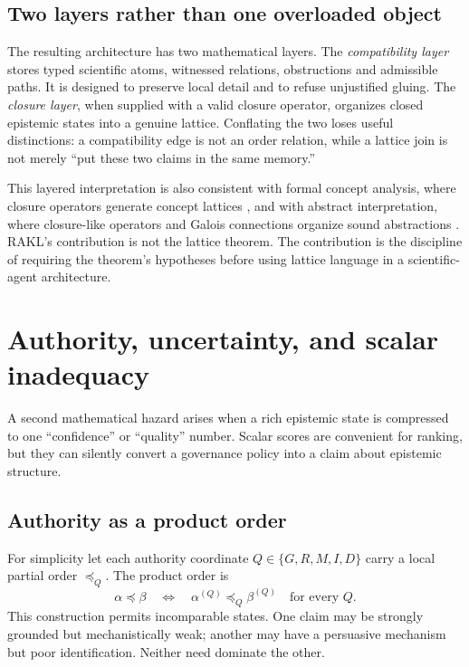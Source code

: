 \documentclass[11pt]{article}
\begin{document}
\subsection{Two layers rather than one overloaded object}

The resulting architecture has two mathematical layers. The \emph{compatibility layer} stores typed scientific atoms, witnessed relations, obstructions and admissible paths. It is designed to preserve local detail and to refuse unjustified gluing. The \emph{closure layer}, when supplied with a valid closure operator, organizes closed epistemic states into a genuine lattice. Conflating the two loses useful distinctions: a compatibility edge is not an order relation, while a lattice join is not merely ``put these two claims in the same memory.''

This layered interpretation is also consistent with formal concept analysis, where closure operators generate concept lattices \cite{ganter1999}, and with abstract interpretation, where closure-like operators and Galois connections organize sound abstractions \cite{cousot1977}. RAKL's contribution is not the lattice theorem. The contribution is the discipline of requiring the theorem's hypotheses before using lattice language in a scientific-agent architecture.

\section{Authority, uncertainty, and scalar inadequacy}

A second mathematical hazard arises when a rich epistemic state is compressed to one ``confidence'' or ``quality'' number. Scalar scores are convenient for ranking, but they can silently convert a governance policy into a claim about epistemic structure.

\subsection{Authority as a product order}

For simplicity let each authority coordinate \(Q\in\{G,R,M,I,D\}\) carry a local partial order \(\preceq_Q\). The product order is
\[
\alpha\preceq\beta
\quad\Longleftrightarrow\quad
\alpha^{(Q)}\preceq_Q\beta^{(Q)}\quad\text{for every }Q.
\]
This construction permits incomparable states. One claim may be strongly grounded but mechanistically weak; another may have a persuasive mechanism but poor identification. Neither need dominate the other.
\end{document}
